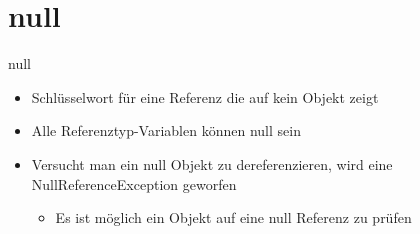 \section{null}
\begin{frame}{null}
	\begin{itemize}
		\item Schlüsselwort für eine Referenz die auf kein Objekt zeigt
		\item Alle Referenztyp-Variablen können \alert{null} sein
		\item Versucht man ein \alert{null} Objekt zu dereferenzieren, wird eine \alert{NullReferenceException} geworfen 
		\begin{itemize}
			\item Es ist möglich ein Objekt auf eine \alert{null} Referenz zu prüfen
		\end{itemize}
	\end{itemize}
		
\end{frame}


